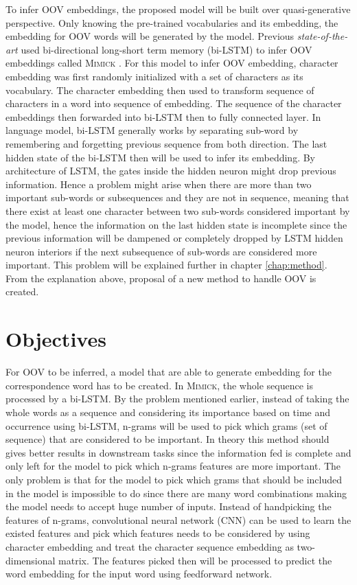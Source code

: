     To infer OOV embeddings, the proposed model will be built over
    quasi-generative perspective. Only knowing the pre-trained
    vocabularies and its embedding, the embedding for OOV words will
    be generated by the model. Previous \textit{state-of-the-art} used
    bi-directional long-short term memory (bi-LSTM) to infer OOV
    embeddings called \textsc{Mimick} \citep{mimicking2017Pinter}. For
    this model to infer OOV embedding, character embedding was first
    randomly initialized with a set of characters as its vocabulary.
    The character embedding then used to transform sequence of
    characters in a word into sequence of embedding. The sequence of
    the character embeddings then forwarded into bi-LSTM then to fully
    connected layer. In language model, bi-LSTM generally works by
    separating sub-word by remembering and forgetting previous
    sequence from both direction. The last hidden state of the bi-LSTM
    then will be used to infer its embedding. By architecture of LSTM,
    the gates inside the hidden neuron might drop previous
    information. Hence a problem might arise when there are more than
    two important sub-words or subsequences and they are not in
    sequence, meaning that there exist at least one character between
    two sub-words considered important by the model, hence the
    information on the last hidden state is incomplete since the
    previous information will be dampened or completely dropped by
    LSTM hidden neuron interiors if the next subsequence of sub-words
    are considered more important. This problem will be explained
    further in chapter \ref{chap:method}. From the explanation above,
    proposal of a new method to handle OOV is created.

\section{Objectives}
    For OOV to be inferred, a model that are able to generate
    embedding for the correspondence word has to be created. In
    \textsc{Mimick}, the whole sequence is processed by a bi-LSTM. By
    the problem mentioned earlier, instead of taking the whole words
    as a sequence and considering its importance based on time and
    occurrence using bi-LSTM, n-grams will be used to pick which grams
    (set of sequence) that are considered to be important. In theory
    this method should gives better results in downstream tasks since
    the information fed is complete and only left for the model to
    pick which n-grams features are more important. The only problem
    is that for the model to pick which grams that should be included
    in the model is impossible to do since there are many word
    combinations making the model needs to accept huge number of
    inputs. Instead of handpicking the features of n-grams,
    convolutional neural network (CNN) can be used to learn the
    existed features and pick which features needs to be considered by
    using character embedding and treat the character sequence
    embedding as two-dimensional matrix. The features picked then will
    be processed to predict the word embedding for the input word
    using feedforward network.

